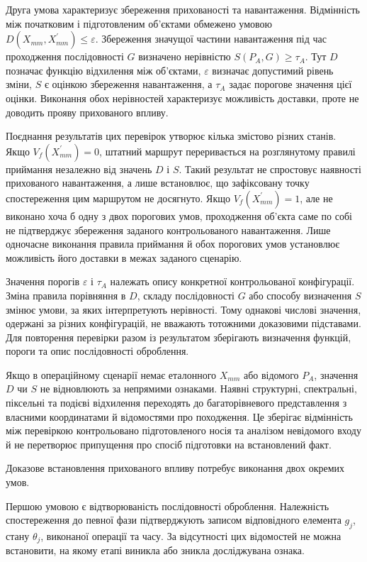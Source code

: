 Друга умова характеризує збереження прихованості та навантаження. Відмінність між початковим і підготовленим об’єктами обмежено умовою $D(X_{mm},X_{mm}^{\prime})\leq\varepsilon$. Збереження значущої частини навантаження під час проходження послідовності $G$ визначено нерівністю $S(P_A,G)\geq\tau_A$. Тут $D$ позначає функцію відхилення між об’єктами, $\varepsilon$ визначає допустимий рівень зміни, $S$ є оцінкою збереження навантаження, а $\tau_A$ задає порогове значення цієї оцінки. Виконання обох нерівностей характеризує можливість доставки, проте не доводить прояву прихованого впливу.

Поєднання результатів цих перевірок утворює кілька змістово різних станів. Якщо $V_f(X_{mm}^{\prime})=0$, штатний маршрут переривається на розглянутому правилі приймання незалежно від значень $D$ і $S$. Такий результат не спростовує наявності прихованого навантаження, а лише встановлює, що зафіксовану точку спостереження цим маршрутом не досягнуто. Якщо $V_f(X_{mm}^{\prime})=1$, але не виконано хоча б одну з двох порогових умов, проходження об’єкта саме по собі не підтверджує збереження заданого контрольованого навантаження. Лише одночасне виконання правила приймання й обох порогових умов установлює можливість його доставки в межах заданого сценарію.

Значення порогів $\varepsilon$ і $\tau_A$ належать опису конкретної контрольованої конфігурації. Зміна правила порівняння в $D$, складу послідовності $G$ або способу визначення $S$ змінює умови, за яких інтерпретують нерівності. Тому однакові числові значення, одержані за різних конфігурацій, не вважають тотожними доказовими підставами. Для повторення перевірки разом із результатом зберігають визначення функцій, пороги та опис послідовності оброблення.

Якщо в операційному сценарії немає еталонного $X_{mm}$ або відомого $P_A$, значення $D$ чи $S$ не відновлюють за непрямими ознаками. Наявні структурні, спектральні, піксельні та подієві відхилення переходять до багаторівневого представлення з власними координатами й відомостями про походження. Це зберігає відмінність між перевіркою контрольовано підготовленого носія та аналізом невідомого входу й не перетворює припущення про спосіб підготовки на встановлений факт.

Доказове встановлення прихованого впливу потребує виконання двох окремих умов.

Першою умовою є відтворюваність послідовності оброблення. Належність спостереження до певної фази підтверджують записом відповідного елемента $g_j$, стану $\theta_j$, виконаної операції та часу. За відсутності цих відомостей не можна встановити, на якому етапі виникла або зникла досліджувана ознака.

